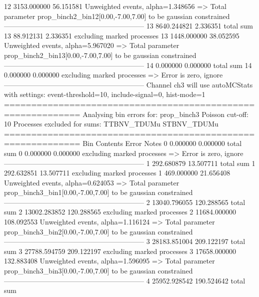 12         3153.000000     56.151581       Unweighted events, alpha=1.348656
  => Total parameter prop_binch2_bin12[0.00,-7.00,7.00] to be gaussian constrained
------------------------------------------------------------
13         8640.244821     2.336351        total sum                     
13         88.912131       2.336351        excluding marked processes    
13         1448.000000     38.052595       Unweighted events, alpha=5.967020
  => Total parameter prop_binch2_bin13[0.00,-7.00,7.00] to be gaussian constrained
------------------------------------------------------------
14         0.000000        0.000000        total sum                     
14         0.000000        0.000000        excluding marked processes    
  => Error is zero, ignore      
------------------------------------------------------------
Channel ch3 will use autoMCStats with settings: event-threshold=10, include-signal=0, hist-mode=1
============================================================
Analysing bin errors for: prop_binch3
Poisson cut-off: 10
Processes excluded for sums: TTBNV_TDUMu STBNV_TDUMu
============================================================
Bin        Contents        Error           Notes                         
0          0.000000        0.000000        total sum                     
0          0.000000        0.000000        excluding marked processes    
  => Error is zero, ignore      
------------------------------------------------------------
1          292.680879      13.507711       total sum                     
1          292.632851      13.507711       excluding marked processes    
1          469.000000      21.656408       Unweighted events, alpha=0.624053
  => Total parameter prop_binch3_bin1[0.00,-7.00,7.00] to be gaussian constrained
------------------------------------------------------------
2          13040.796055    120.288565      total sum                     
2          13002.283852    120.288565      excluding marked processes    
2          11684.000000    108.092553      Unweighted events, alpha=1.116124
  => Total parameter prop_binch3_bin2[0.00,-7.00,7.00] to be gaussian constrained
------------------------------------------------------------
3          28183.851004    209.122197      total sum                     
3          27788.594759    209.122197      excluding marked processes    
3          17658.000000    132.883408      Unweighted events, alpha=1.596095
  => Total parameter prop_binch3_bin3[0.00,-7.00,7.00] to be gaussian constrained
------------------------------------------------------------
4          25952.928542    190.524642      total sum                     
